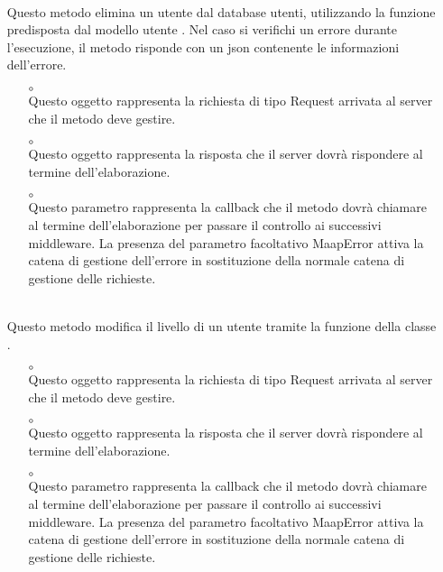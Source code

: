 \begin{itemize}
\begin{itemize}
\end{itemize}
\item[]  \\ Questo metodo elimina un utente dal database utenti, utilizzando la funzione predisposta dal modello utente . Nel caso si verifichi un errore durante l'esecuzione, il metodo risponde con un json contenente le informazioni dell'errore.
\begin{itemize}\addtolength{\itemsep}{-0.5\baselineskip}
\item[$\circ$]  \\ Questo oggetto rappresenta la richiesta di tipo Request arrivata al server che il metodo deve gestire.
\item[$\circ$]  \\ Questo oggetto rappresenta la risposta che il server dovrà rispondere al termine dell'elaborazione.
\item[$\circ$]  \\ Questo parametro rappresenta la callback che il metodo dovrà chiamare al termine dell'elaborazione per passare il controllo ai successivi middleware. La presenza del parametro facoltativo MaapError attiva la catena di gestione dell'errore in sostituzione della normale catena di gestione delle richieste.
\end{itemize}
\item[]  \\ Questo metodo modifica il livello di un utente tramite la funzione  della classe .
\begin{itemize}\addtolength{\itemsep}{-0.5\baselineskip}
\item[$\circ$]  \\ Questo oggetto rappresenta la richiesta di tipo Request arrivata al server che il metodo deve gestire.
\item[$\circ$]  \\ Questo oggetto rappresenta la risposta che il server dovrà rispondere al termine dell'elaborazione.
\item[$\circ$]  \\ Questo parametro rappresenta la callback che il metodo dovrà chiamare al termine dell'elaborazione per passare il controllo ai successivi middleware. La presenza del parametro facoltativo MaapError attiva la catena di gestione dell'errore in sostituzione della normale catena di gestione delle richieste.

\end{itemize}
\end{itemize}
